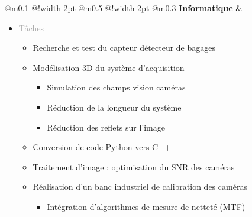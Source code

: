 \documentclass{article}
\begin{document}
\begin{tabular}
    {
        @{}m{}
        @{\hspace{0.001\textwidth}}!{\color{secondaryBlue}\vline width 2pt} %
        @{}m{0.5\textwidth}
        @{\hspace{0.025\textwidth}}!{\color{secondaryBlue}\vline width 2pt} %
        @{{\hspace{0.001\textwidth}}}m{0.3\textwidth}
    }
    \textcolor{secondaryBlue}
    {
        \textbf{Informatique}
    }           
    &
    \begin{itemize}
        [label={}, topsep=8pt, partopsep=0pt, itemsep=0.5pt, parsep=2pt,after=\vspace*{-\baselineskip}]
        \setlength{\itemsep}{10pt} 

        \item \textcolor{darkGray}{Tâches} 
        \begin{itemize}
        [label={\textcolor{gray!100}{\checkmark}}, topsep=8pt, partopsep=0pt, itemsep=0.5pt, parsep=2pt] 
            \item \textcolor{gray!100}{Recherche et test du capteur détecteur de bagages}
            \item \textcolor{gray!100}{Modélisation 3D du système d'acquisition}
            \begin{itemize}
                [label={\textcolor{gray!100}{$\triangleright$}}, topsep=0pt, partopsep=0pt, itemsep=0.5pt, parsep=2pt]
                \item \textcolor{gray!100}{Simulation des champs vision caméras}
                \item \textcolor{gray!100}{Réduction de la longueur du système}
                \item \textcolor{gray!100}{Réduction des reflets sur l'image}
            \end{itemize}
            \item \textcolor{gray!100}{Conversion de code Python vers C++}
            \item \textcolor{gray!100}{Traitement d'image : optimisation du SNR des caméras}
            \item \textcolor{gray!100}{Réalisation d'un banc industriel de calibration des caméras}
            \begin{itemize}
            [label={\textcolor{gray!100}{$\triangleright$}}, topsep=0pt, partopsep=0pt, itemsep=0.5pt, parsep=2pt]   
                \item \textcolor{gray!100}{Intégration d'algorithmes de mesure de netteté (MTF) }

\end{itemize}
\end{itemize}
\end{itemize}
\end{tabular}
\end{document}
